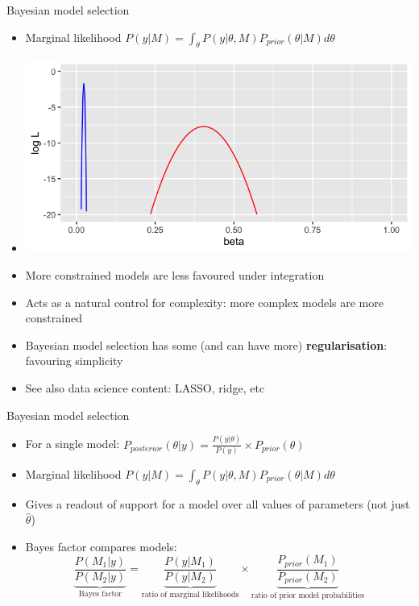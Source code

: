 \documentclass[10pt]{beamer}
\begin{document}
\begin{frame}{Bayesian model selection}
  \begin{itemize}
    \item Marginal likelihood $P(y|M) = \int_{\theta} P(y|\theta, M) P_{prior}(\theta|M) d\theta$
      \item[] \includegraphics[width=.8\textwidth]{cedas-bayes-peaks.png}
      \item More constrained models are less favoured under integration
      \item Acts as a natural control for complexity: more complex models are more constrained
      \item Bayesian model selection has some (and can have more) \textbf{regularisation}: favouring simplicity
        \item See also data science content: LASSO, ridge, etc
  \end{itemize}
\end{frame}


\begin{frame}{Bayesian model selection}
  \begin{itemize}
    \item For a single model: $P_{posterior}(\theta|y) = \frac{P(y|\theta)}{P(y)} \times P_{prior}(\theta)$
    \item Marginal likelihood $P(y|M) = \int_{\theta} P(y|\theta, M) P_{prior}(\theta|M) d\theta$
    \item Gives a readout of support for a model over all values of parameters (not just $\hat{\theta}$)
    \item Bayes factor compares models:
      \begin{equation*}
        \underbrace{\frac{P(M_1 | y)}{P(M_2 | y)}}_{\text{Bayes factor}} = \underbrace{\frac{P(y|M_1)}{P(y|M_2)}}_{\text{ratio of marginal likelihoods}} \times \underbrace{\frac{P_{prior}(M_1)}{P_{prior}(M_2)}}_{\text{ratio of prior model probabilities}}
      \end{equation*}
  \end{itemize}
\end{frame}
\end{document}
